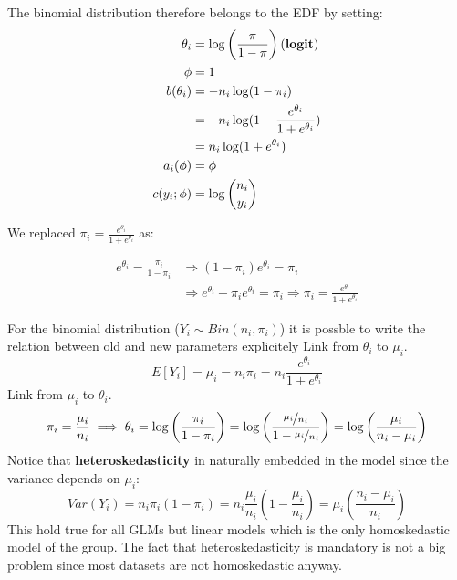       The binomial distribution therefore belongs to the EDF by setting:
      \begin{align*}
        \theta_i     &= \log\left(\frac{\pi}{1-\pi}\right) \text{(\textbf{logit})} \\
        \phi         &= 1 \\
        b(\theta_i)  &= - n_i \log(1-\pi_i)\\
                     &= -n_i \log(1-\frac{e^{\theta_i}}{1 + e^{\theta_i}}) \\
                     &= n_i \log(1 + e^{\theta_i}) \\
        a_i(\phi)    &= \phi \\
        c(y_i; \phi) &= \log\binom{n_i}{y_i}
      \end{align*}

We replaced  $\pi_i = \frac{e^{\theta_i}}{1 + e^{\theta_i}}$ as:

	\begin{align*}
	e^{\theta_i} = \frac{\pi_i}{1-\pi_i} & \Rightarrow (1-\pi_i)e^{\theta_i} = \pi_i \\
	& \Rightarrow e^{\theta_i} - \pi_i e^{\theta_i} = \pi_i \Rightarrow \pi_i = \frac{e^{\theta_i}}{1+ e^{\theta_i}}
	\end{align*}

      For the binomial distribution ($Y_i \sim Bin(n_i, \pi_i)$) it is possble to write the relation between old and new parameters explicitely
      Link from $\theta_i$ to $\mu_i$.
      $$E[Y_i] = \mu_i = n_i\pi_i = n_i\frac{e^{\theta_i}}{1 + e^{\theta_i}}$$
      Link from $\mu_i$ to $\theta_i$.
      $$\pi_i = \frac{\mu_i}{n_i} \implies \theta_i = \log\left(\frac{\pi_i}{1-\pi_i}\right) = \log\left(\frac{\nicefrac{\mu_i}{n_i}}{1-\nicefrac{\mu_i}{n_i}}\right)=\log\left(\frac{\mu_i}{n_i-\mu_i}\right)$$
      Notice that \textbf{heteroskedasticity} in naturally embedded in the model since the variance depends on $\mu_i$:
      $$Var(Y_i) = n_i\pi_i(1-\pi_i) = n_i\frac{\mu_i}{n_i}\left(1-\frac{\mu_i}{n_i}\right) = \mu_i\left(\frac{n_i - \mu_i}{n_i}\right)$$
      This hold true for all GLMs but linear models which is the only homoskedastic model of the group. The fact that heteroskedasticity is mandatory is not a big problem since most datasets are not homoskedastic anyway.

